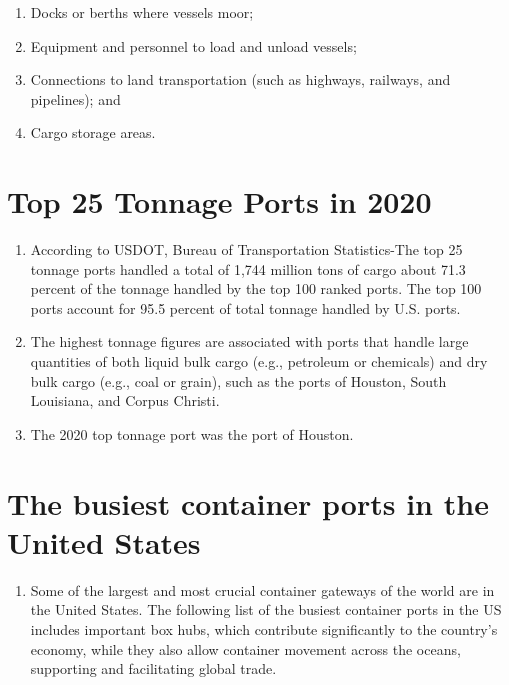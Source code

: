 \documentclass[
]{book}
\providecommand{\tightlist}{%
  \setlength{\itemsep}{0pt}\setlength{\parskip}{0pt}}
\begin{document}
\begin{enumerate}
\def\labelenumi{\alph{enumi})}
\tightlist
\item
  Docks or berths where vessels moor;
\item
  Equipment and personnel to load and unload vessels;
\item
  Connections to land transportation (such as highways, railways, and pipelines); and
\item
  Cargo storage areas.
\end{enumerate}

\hypertarget{intro-Tonnage_Port}{%
\section{Top 25 Tonnage Ports in 2020}\label{intro-Tonnage_Port}}

\begin{enumerate}
\def\labelenumi{\arabic{enumi})}
\item
  According to USDOT, Bureau of Transportation Statistics-The top 25 tonnage ports handled a total of 1,744 million tons of cargo about 71.3 percent of the tonnage handled by the top 100 ranked ports. The top 100 ports account for 95.5 percent of total tonnage handled by U.S. ports.
\item
  The highest tonnage figures are associated with ports that handle large quantities of both liquid bulk cargo (e.g., petroleum or chemicals) and dry bulk cargo (e.g., coal or grain), such as the ports of Houston, South Louisiana, and Corpus Christi.
\item
  The 2020 top tonnage port was the port of Houston.
\end{enumerate}

\hypertarget{intro-busiest_Port}{%
\section{The busiest container ports in the United States}\label{intro-busiest_Port}}

\begin{enumerate}
\def\labelenumi{\arabic{enumi})}
\tightlist
\item
  Some of the largest and most crucial container gateways of the world are in the United States. The following list of the busiest container ports in the US includes important box hubs, which contribute significantly to the country's economy, while they also allow container movement across the oceans, supporting and facilitating global trade.
\end{enumerate}
\end{document}
